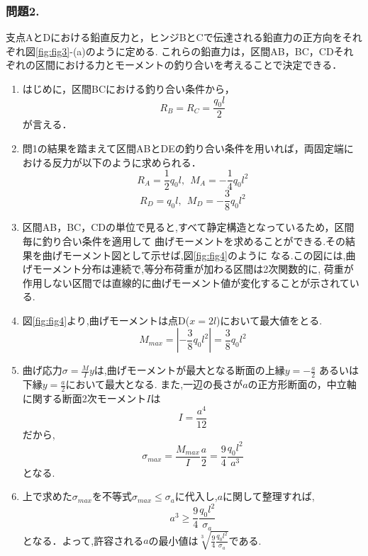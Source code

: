 ﻿\documentclass[10pt,a4j]{jarticle}
\begin{document}
\subsubsection*{問題2.}
支点AとDにおける鉛直反力と，ヒンジBとCで伝達される鉛直力の正方向をそれぞれ図\ref{fig:fig3}-(a)のように定める.
これらの鉛直力は，区間AB，BC，CDそれぞれの区間における力とモーメントの釣り合いを考えることで決定できる．
\begin{enumerate}
\item
はじめに，区間BCにおける釣り合い条件から，
\begin{equation}
	R_B=R_C=\frac{q_0l}{2}
\end{equation}
が言える．
\item
問1の結果を踏まえて区間ABとDEの釣り合い条件を用いれば，両固定端における反力が以下のように求められる．
\begin{equation}
	R_A=\frac{1}{2}q_0l, \ \ M_A=-\frac{1}{4}q_0l^2  
\end{equation}
\begin{equation}
	R_D=q_0l, \ \ M_D=-\frac{3}{8}q_0l^2
\end{equation}
\item
区間AB，BC，CDの単位で見ると,すべて静定構造となっているため，区間毎に釣り合い条件を適用して
曲げモーメントを求めることができる.その結果を曲げモーメント図として示せば,図\ref{fig:fig4}のように
なる.この図には,曲げモーメント分布は連続で,等分布荷重が加わる区間は2次関数的に,
荷重が作用しない区間では直線的に曲げモーメント値が変化することが示されている.
\item
図\ref{fig:fig4}より,曲げモーメントは点D($x=2l$)において最大値をとる.
\begin{equation}
	M_{max}=\left|-\frac{3}{8}q_0l^2\right| = \frac{3}{8}q_0l^2
\end{equation}
\item
	曲げ応力$\sigma=\frac{M}{I}y$は,曲げモーメントが最大となる断面の上縁$y=-\frac{a}{2}$
	あるいは下縁$y=\frac{a}{2}$において最大となる.
	また,一辺の長さが$a$の正方形断面の，中立軸に関する断面2次モーメント$I$は
\begin{equation}
	I=\frac{a^4}{12}	
\end{equation}
だから,
\begin{equation}
	\sigma_{max}=
	\frac{M_{max}}{I}\frac{a}{2}=
	\frac{9}{4} \frac{q_0l^2}{a^3}
\end{equation}
となる.
\item
	上で求めた$\sigma_{max}$を不等式$\sigma_{max}\leq \sigma_a$に代入し,$a$に関して整理すれば,
\begin{equation}
	a^3 \geq \frac{9}{4}\frac{q_0l^2}{\sigma_a} 
\end{equation}
		となる．よって,許容される$a$の最小値は$\sqrt[3]{\frac{9}{4}\frac{q_0l^2}{\sigma_a}}$である.
\end{enumerate}
\end{document}
